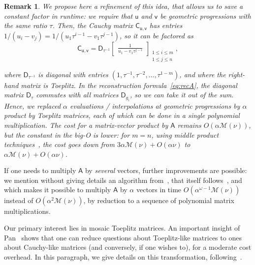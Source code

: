 \documentclass[sigconf]{acmart}
\newcommand{\vu}{\ensuremath{\mathsf{u}}}
\newcommand{\vv}{\ensuremath{\mathsf{v}}}
\newcommand{\mA}{\ensuremath{\mathsf{A}}}
\newcommand{\mC}{\ensuremath{\mathsf{C}}}
\newcommand{\mD}{\ensuremath{\mathsf{D}}}
\newcommand{\M}{\ensuremath{\mathscr{M}}}
\newcommand{\mx}{\ensuremath{\nu}}
\theoremstyle{acmdefinition}
\newtheorem{remark}[theorem]{Remark}
\begin{document}
\vspace{-2mm}

\begin{remark}\label{rmk:factor3}
We propose here a refinement of this idea, that allows us to
save a constant factor in runtime: we require that $\vu$ and $\vv$ be
geometric progressions with {\em the same ratio} $\tau$. Then, the
Cauchy matrix $\mC_{\vu,\vv}$ has entries $1/(u_i -
v_j) = 1/(u_1 \tau^{i-1} - v_1 \tau^{j-1})$, so it can be factored as
\vspace{-3px}
$$
\mC_{\vu,\vv}=\mD_{\tau^{-1}}
\begin{bmatrix}
\frac{1}{u_1 - v_1 \tau^{j-i}}
\end{bmatrix}_{\substack{1 \leq i \leq m\\1 \leq j \leq n}},
$$

\vspace{-3px}
\noindent where $\mD_{\tau^{-1}}$ is diagonal with entries
$(1,\tau^{-1},\tau^{-2},\dots,\tau^{1-m})$, and where the right-hand matrix
is Toeplitz. In the reconstruction formula~\eqref{eq:recA}, the
diagonal matrix $\mD_\tau$ commutes with all matrices $\mD_{g_i}$, so
we can take it out of the sum. Hence, we replaced $\alpha$ evaluations
/ interpolations at geometric progressions by $\alpha$ product by
Toeplitz matrices, each of which can be done in a single polynomial
multiplication. The cost for a matrix-vector product by $\mA$ remains
$O(\alpha \M(\mx))$, but the constant in the big-O is lower: for $m=n$,
using middle product techniques~\cite{HaQuZi04,BoLeSc03}, the
cost goes down from $3\alpha \M(\mx) +O(\alpha \mx)$ to $\alpha \M(\mx)
+O(\alpha \mx)$. 
\end{remark}

If one needs to multiply $\mA$ by {\em several} vectors,
further improvements are possible: we mention without giving details
an algorithm from~\cite{BoJeMoSc16}, that itself
follows~\cite{BoJeSc08}, and which makes it possible to multiply $\mA$
by $\alpha$ vectors in time $O(\alpha^{\omega-1} \M(\mx))$ instead of
$O(\alpha^2 \M(\mx))$, by reduction to a sequence of polynomial matrix
multiplications.

\smallskip{}
Our primary interest lies in mosaic
Toep\-litz matrices. An important insight of Pan~\cite{Pan90} shows
that one can reduce questions about Toeplitz-like matrices to ones
about Cauchy-like matrices (and conversely, if one wishes to), for a
moderate cost overhead. In this paragraph, we give details on 
this transformation, following~\cite[Chapter~4.8]{Pan01}.
\end{document}

